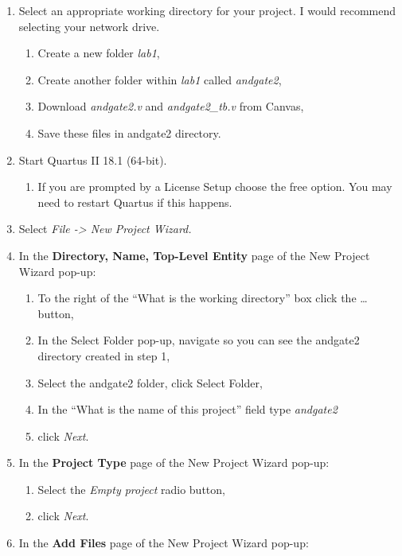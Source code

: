 \begin{enumerate}
\def\labelenumi{\arabic{enumi}.}
\item
  Select an appropriate working directory for your project. I would
  recommend selecting your network drive.

  \begin{enumerate}
  \def\labelenumii{\alph{enumii}.}
  \item
    Create a new folder \emph{lab1},
  \item
    Create another folder within \emph{lab1} called \emph{andgate2},
  \item
    Download \emph{andgate2.v} and \emph{andgate2\_tb.v} from Canvas,
  \item
    Save these files in andgate2 directory.
  \end{enumerate}
\item
  Start Quartus II 18.1 (64-bit).

  \begin{enumerate}
  \def\labelenumii{\alph{enumii}.}
  \item
    If you are prompted by a License Setup choose the free option. You
    may need to restart Quartus if this happens.
  \end{enumerate}
\item
  Select \emph{File -\textgreater{} New Project Wizard.}
\item
  In the \textbf{Directory, Name, Top-Level Entity} page of the New
  Project Wizard pop-up:

  \begin{enumerate}
  \def\labelenumii{\alph{enumii}.}
  \item
    To the right of the ``What is the working directory'' box click the
    \ldots{} button,
  \item
    In the Select Folder pop-up, navigate so you can see the andgate2
    directory created in step 1,
  \item
    Select the andgate2 folder, click Select Folder,
  \item
    In the ``What is the name of this project'' field type
    \emph{andgate2}
  \item
    click \emph{Next}.
  \end{enumerate}
\item
  In the \textbf{Project Type} page of the New Project Wizard pop-up:

  \begin{enumerate}
  \def\labelenumii{\alph{enumii}.}
  \item
    Select the \emph{Empty project} radio button,
  \item
    click \emph{Next}.
  \end{enumerate}
\item
  In the \textbf{Add Files} page of the New Project Wizard pop-up:


\end{enumerate}
